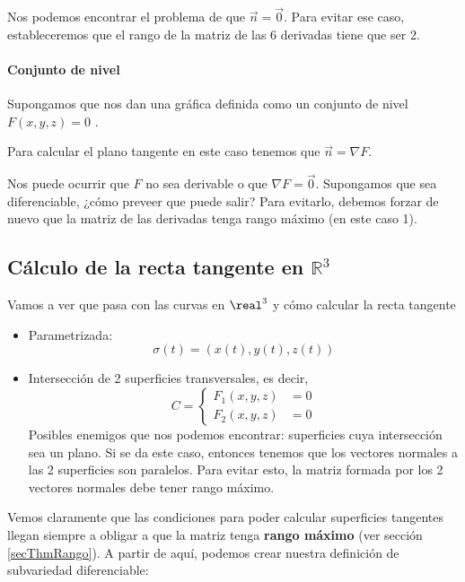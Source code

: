      Nos podemos encontrar el problema de que $\overrightarrow{n} = \overrightarrow{0}$. Para evitar ese caso, estableceremos que el rango de la matriz de las 6 derivadas tiene que ser 2.
     
   \paragraph{Conjunto de nivel} Supongamos que nos dan una gráfica definida como un conjunto de nivel $F(x,y,z) = 0$ .
   
   Para calcular el plano tangente en este caso tenemos que $\overrightarrow{n} = \nabla F$. 
   
   Nos puede ocurrir que $F$ no sea derivable o que $\nabla F = \overrightarrow{0}$. Supongamos que sea diferenciable, ¿cómo preveer que puede salir? Para evitarlo, debemos forzar de nuevo que la matriz de las derivadas tenga rango máximo (en este caso 1).
   
   \subsection{Cálculo de la recta tangente en $ℝ^3$}
  
  Vamos a ver que pasa con las curvas en $\real^3$ y cómo calcular la recta tangente
  
  \begin{itemize}
   \item Parametrizada: \[\sigma(t) = (x(t),y(t),z(t))\]   
   \item Intersección de 2 superficies transversales, es decir,   
   \[C = \left\{\begin{array}{cc} F_1(x,y,z) &= 0\\ F_2(x,y,z) &= 0 \end{array} \right.\]   
   Posibles enemigos que nos podemos encontrar: superficies cuya intersección sea un plano. Si se da este caso, entonces tenemos que los vectores normales a las 2 superficies son paralelos. Para evitar esto, la matriz formada por los 2 vectores normales debe tener rango máximo.                                                                   
  \end{itemize}

 	Vemos claramente que las condiciones para poder calcular superficies tangentes llegan siempre a obligar a que la matriz tenga \textbf{rango máximo} (ver sección \ref{secThmRango}). A partir de aquí, podemos crear nuestra definición de subvariedad diferenciable:
 	
